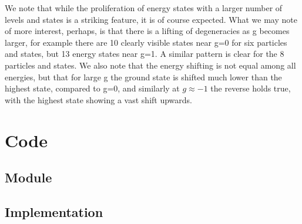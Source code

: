 \documentclass[11pt]{article} %
\begin{document}
We note that while the proliferation of energy states with a larger number of levels and states is a striking feature, it is of course expected. What we may note of more interest, perhaps, is that there is a lifting of degeneracies as g becomes larger, for example there are 10 clearly visible states near g=0 for six particles and states, but 13 energy states near g=1. A similar pattern is clear for the 8 particles and states. We also note that the energy shifting is not equal among all energies, but that for large g the ground state is shifted much lower than the highest state, compared to g=0, and similarly at $g\approx -1$ the reverse holds true, with the highest state showing a vast shift upwards. 

\section{Code}
\subsection{Module}

\subsection{Implementation}


\end{document}
